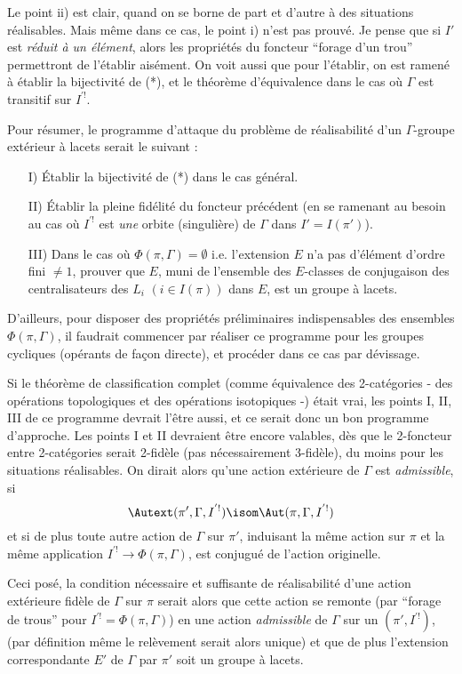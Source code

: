 Le point ii) est clair, quand on se borne de part et d'autre à des situations réalisables. Mais même dans ce cas, le point i) n'est pas prouvé. Je pense que si $I'$ est \emph{réduit à un élément}, alors les propriétés du foncteur ``forage d'un trou'' permettront de l'établir aisément. On voit aussi que pour l'établir, on est ramené à établir la bijectivité de (*), et le théorème d'équivalence dans le cas où $\Gamma$ est transitif sur $I^{'!}$.  

Pour résumer, le programme d'attaque du problème de réalisabilité d'un $\Gamma$-groupe extérieur à lacets serait le suivant :
\begin{enumerate}
    \item[I)] Établir la bijectivité de (*) dans le cas général. 
    \item[II)] Établir la pleine fidélité du foncteur précédent (en se ramenant au besoin au cas où $I^{'!}$ est \emph{une} orbite (singulière) de $\Gamma$ dans $I' = I(\pi')$).
    \item[III)] Dans le cas où $\Phi(\pi, \Gamma) = \emptyset$ i.e. l'extension $E$ n'a pas d'élément d'ordre fini $\neq 1$, prouver que $E$, muni de l'ensemble des $E$-classes de conjugaison des centralisateurs des $L_i$ $(i \in I (\pi))$ dans $E$, est un groupe à lacets.
\end{enumerate}

D'ailleurs, pour disposer des propriétés préliminaires indispensables des ensembles   $\Phi (\pi, \Gamma)$, il faudrait commencer par réaliser ce programme pour les groupes cycliques (opérants de fa\c{c}on directe), et procéder dans ce cas par dévissage.

Si le théorème de classification complet (comme équivalence des 2-catégories - des opérations topologiques et des opérations isotopiques -) était vrai, les points I, II, III de ce programme devrait l'être aussi, et ce serait donc un bon programme d'approche. Les points I et II devraient être encore valables, dès que le 2-foncteur entre 2-catégories serait 2-fidèle (pas nécessairement 3-fidèle), du moins pour les situations réalisables. On dirait alors qu'une action extérieure de $\Gamma$ est \emph{admissible}, si
$$
\Autext (\pi', \Gamma, I^{'!}) \isom \Aut (\pi, \Gamma, I^{'!})
$$
et si de plus toute autre action de $\Gamma$ sur $\pi'$, induisant la même action sur $\pi$ et la même application $I^{'!} \to \Phi (\pi, \Gamma)$, est conjugué de l'action originelle.

Ceci posé, la condition nécessaire et suffisante de réalisabilité d'une action extérieure fidèle de $\Gamma$ sur $\pi$ serait alors que cette action se remonte (par ``forage de trous'' pour $I^{'!} = \Phi(\pi, \Gamma)$) en une action \emph{admissible} de $\Gamma$ sur un $(\pi', I^{'!})$, (par définition même le relèvement serait alors unique) et que de plus l'extension correspondante $E'$ de $\Gamma$ par $\pi'$ soit un groupe à lacets.












